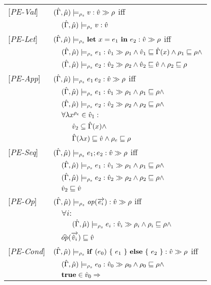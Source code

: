 \begin{table}[tlb]
\begin{tabular}{l l l l}
{[\textit{PE-Val}]}&\multicolumn{3}{l}{$\caest {v}$ iff}\\
&&\multicolumn{2}{l}{$\aenvs \modelrho v : \vat$} \\
{[\textit{PE-Let}]}&\multicolumn{3}{l}{$\caest {\letexpr{x}{e_1}{e_2}}$ iff}\\
&&\multicolumn{2}{l}{$\caesti {e_1} {1} \wedge \vat_1 \sqsubseteq \Env(x) \wedge \rho_1 \sqsubseteq \rho \wedge$} \\
&&\multicolumn{2}{l}{$\aenvs \modelrho e_2 : \vat_2 \gg \rho_2 \wedge \vat_2 \sqsubseteq \vat \wedge \rho_2 \sqsubseteq \rho$} \\
{[\textit{PE-App}]}&\multicolumn{3}{l}{$\caest {\appl {e_1} {e_2}}$ iff} \\
&&\multicolumn{2}{l}{$\caesti {e_1} {1} \wedge \rho_1 \sqsubseteq \rho \wedge$} \\
&&\multicolumn{2}{l}{$\caesti {e_2} {2} \wedge \rho_2 \sqsubseteq \rho \wedge$} \\
&&\multicolumn{2}{l}{$\forall \lambda x^{\rho_e} \in \vat_1 :$}\\
&&&$\vat_2 \subseteq \Env(x) \wedge$\\
&&&$\Env(\lambda x) \sqsubseteq \vat \wedge \rho_e \sqsubseteq \rho$\\ 
{[\textit{PE-Seq}]}&\multicolumn{3}{l}{$\caest {e_1; e_2} $ iff}\\
&&\multicolumn{2}{l}{$ \caesti {e_1} {1} \wedge \rho_1 \sqsubseteq \rho \wedge$}\\
&&\multicolumn{2}{l}{$ \caesti {e_2} {2} \wedge \rho_2 \sqsubseteq \rho \wedge$} \\
&&\multicolumn{2}{l}{$\vat_2 \sqsubseteq \vat$} \\
{[\textit{PE-Op}]}&\multicolumn{3}{l}{$\caest {\op (\vec{e_i})} $ iff}\\
&&\multicolumn{2}{l}{$\forall i :$}\\
&&&$\caesti {e_i} {i} \wedge \rho_i \sqsubseteq \rho \wedge$\\
&&\multicolumn{2}{l}{$\widehat{op} (\vec{\vat_i}) \sqsubseteq \vat $}\\
{[\textit{PE-Cond}]}&\multicolumn{3}{l}{$\caest {\cond {e_0} {e_1} {e_2}} $ iff}\\
&&\multicolumn{2}{l}{$\caesti {e_0} {0} \wedge \rho_0 \sqsubseteq \rho \wedge$}\\
&&\multicolumn{2}{l}{$\mathbf{\true} \in \vat_0 \Rightarrow$}\\

\end{tabular}
\end{table}
